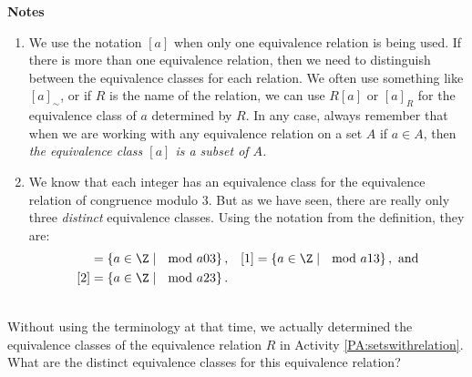 \noindent
\textbf{Notes}
\begin{enumerate}
  \item We use the notation  $[ a ]$ when only one equivalence relation is being used.  If there is more than one equivalence relation, then we need to distinguish between the equivalence classes for each relation.  We often use something like  
$[ a ]_{ \sim} $, or if  $R$  is the name of the relation, we can use  
$R[ a ]$ or $[a]_R$ for the equivalence class of  $a$  determined by  $R$.
In any case, always remember that when we are working with any equivalence relation on a set  $A$  if $a \in A$,  then \emph{the equivalence class  $[ a ]$ is a subset of  $A$.}

  \item We know that each integer has an equivalence class for the equivalence relation of congruence modulo 3.  But as we have seen, there are really only three \emph{distinct} equivalence classes.  Using the notation from the definition, they are:
\begin{align*}
[0] &= \left\{ a \in \Z \mid \mod{a}{0}{3} \right\}, & [1] &= \left\{ a \in \Z \mid \mod{a}{1}{3} \right\}, \text{ and} \\
[2] &= \left\{ a \in \Z \mid \mod{a}{2}{3} \right\}.
\end{align*}
\end{enumerate}
\hbreak


\begin{prog} \label{prog:prev73} \hfill \\
Without using the terminology at that time, we actually determined the equivalence classes of the equivalence relation $R$ in \typeu Activity \ref*{PA:setswithrelation}.  What are the distinct equivalence classes for this equivalence relation?
\end{prog}
\hbreak

\endinput
